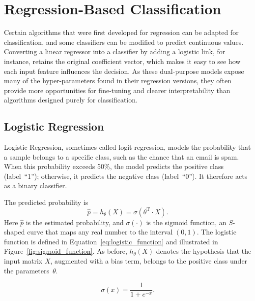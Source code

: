 \documentclass[12pt,letter]{article}
\begin{document}
	\setcounter{section}{3}	
	\setcounter{figure}{0}   
	\renewcommand\thefigure{\thesection.\arabic{figure}}
	\setcounter{equation}{0}   
	\renewcommand\theequation{\thesection.\arabic{equation}}

\section{Regression-Based Classification}

Certain algorithms that were first developed for regression can be adapted for classification, and some classifiers can be modified to predict continuous values. Converting a linear regressor into a classifier by adding a logistic link, for instance, retains the original coefficient vector, which makes it easy to see how each input feature influences the decision. As these dual-purpose models expose many of the hyper-parameters found in their regression versions, they often provide more opportunities for fine-tuning and clearer interpretability than algorithms designed purely for classification.

\subsection{Logistic Regression}


Logistic Regression, sometimes called logit regression, models the probability that a sample belongs to a specific class, such as the chance that an email is spam. When this probability exceeds 50\%, the model predicts the positive class (label~``1''); otherwise, it predicts the negative class (label~``0''). It therefore acts as a binary classifier.


The predicted probability is
\begin{equation}
    \hat{p} = h_\theta(X) = \sigma(\theta^\text{T} \cdot X).
\end{equation}
Here $\hat{p}$ is the estimated probability, and $\sigma(\cdot)$ is the sigmoid function, an $S$-shaped curve that maps any real number to the interval $(0,1)$. The logistic function is defined in Equation~\ref{eq:logistic_function} and illustrated in Figure~\ref{fig:sigmoid_function}. As before, $h_\theta(X)$ denotes the hypothesis that the input matrix $X$, augmented with a bias term, belongs to the positive class under the parameters~$\theta$.


\begin{equation}
    \sigma(x) = \frac{1}{1 + e^{-x} }.
    \label{eq:logistic_function}
\end{equation}
\end{document}
